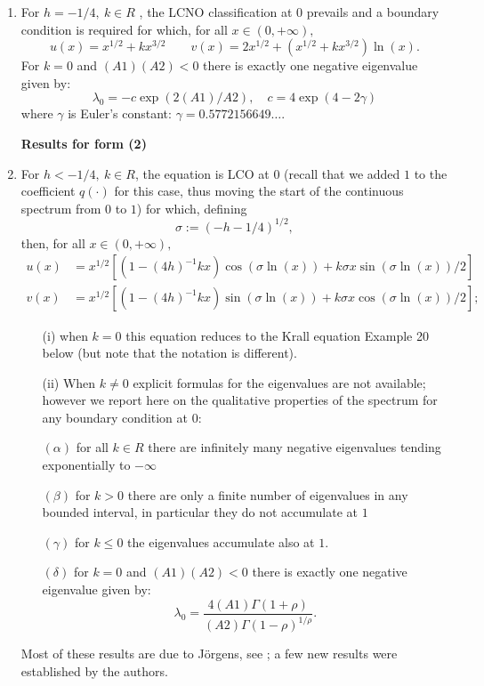 \documentclass[12pt]{amsart}%
\theoremstyle{plain}
\numberwithin{equation}{section}
\begin{document}
\begin{enumerate}
\begin{enumerate}
\item For $h=-1/4,\ k\in R$ , the LCNO classification at $0$ prevails and a
boundary condition is required for which, for all $x\in(0,+\infty),$%
\[
u(x)=x^{1/2}+kx^{3/2}\quad\quad v(x)=2x^{1/2}+\left(  x^{1/2}+kx^{3/2}\right)
\ln(x).
\]
\noindent For $k=0$ and $(A1)(A2)<0$ there is exactly one negative eigenvalue
given by:
\[
\lambda_{0}=-c\exp(2(A1)/A2),\quad c=4\exp(4-2\gamma)
\]
where $\gamma$ is Euler's constant: $\gamma=0.5772156649\ldots$.

\noindent\noindent\textbf{Results for form (2)}

\item For $h<-1/4,\ k\in R$, the equation is LCO at $0$ (recall that we added
$1$ to the coefficient $q(\cdot)$ for this case, thus moving the start of the
continuous spectrum from $0$ to $1$) for which, defining%
\[
\sigma:=(-h-1/4)^{1/2},
\]
then, for all $x\in(0,+\infty),$%
\begin{align*}
u(x)  &  =x^{1/2}\left[  (1-(4h)^{-1}kx)\cos(\sigma\ln(x))+k\sigma
x\sin(\sigma\ln(x))/2\right] \\
v(x)  &  =x^{1/2}\left[  (1-(4h)^{-1}kx)\sin(\sigma\ln(x))+k\sigma
x\cos(\sigma\ln(x))/2\right]  ;
\end{align*}

\begin{itemize}
\item[(i)] when $k=0$ this equation reduces to the Krall equation Example 20
below (but note that the notation is different).

\item[(ii)] When $k\not =0$ explicit formulas for the eigenvalues are not
available; however we report here on the qualitative properties of the
spectrum for any boundary condition at $0$:

$(\alpha)$ for all $k\in R$ there are infinitely many negative eigenvalues
tending exponentially to $-\infty$

$(\beta)$ for $k>0$ there are only a finite number of eigenvalues in any
bounded interval, in particular they do not accumulate at $1$

$(\gamma)$ for $k\leq0$ the eigenvalues accumulate also at $1$.

$(\delta)$ for $k=0$ and $(A1)(A2)<0$ there is exactly one negative eigenvalue
given by:
\[
\lambda_{0}=\frac{4\left(  A1\right)  \Gamma(1+\rho)}{\left(  A2\right)
\Gamma(1-\rho)^{1/\rho}}.
\]
\end{itemize}

Most of these results are due to J\"{o}rgens, see \cite[Section 10]{J}; a few
new results were established by the authors.
\end{enumerate}


\end{enumerate}
\end{document}
